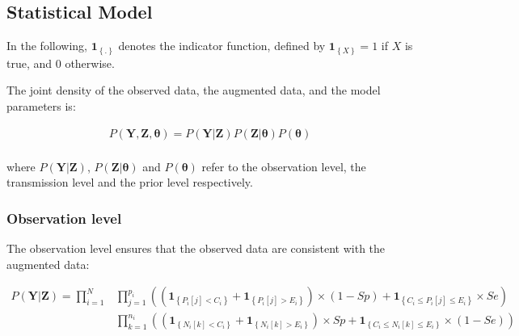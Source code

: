 \documentclass[10pt]{article}
\begin{document}
\subsection*{Statistical Model}

In the following, $\mathbf{1}_{\left\lbrace.\right\rbrace}$ denotes the indicator function, defined by $\mathbf{1}_{\left\lbrace X \right\rbrace}=1$ if $X$ is true, and $0$ otherwise.

The joint density of the observed data, the augmented data, and the model parameters is: 

\begin{equation} \label {JointDensity}
\begin{split}
P\left(\bm{Y},\bm{Z},\bm{\theta}\right) = P\left(\bm{Y}|\bm{Z}\right)P\left(\bm{Z}|\bm{\theta}\right)P\left(\bm{\theta}\right)\\ \nonumber
\end{split}
\end{equation}

\noindent where $P\left(\bm{Y}|\bm{Z}\right)$, $P\left(\bm{Z}|\bm{\theta}\right)$ 
and $P\left(\bm{\theta}\right)$ refer to the observation level, the transmission level
 and the prior level respectively.


\subsubsection*{Observation level}


The observation level ensures that the observed data are consistent with the augmented data:

\begin{eqnarray*}
P\left(\bm{Y}|\bm{Z}\right) =
\bm{\prod}_{i=1}^N %
& \bm{\prod}_{j=1}^{p_i} %
\left(
\left( \mathbf{1}_{\left\lbrace P_i[j] < C_i \right\rbrace}+\mathbf{1}_{\left\lbrace P_i[j] > E_i \right\rbrace} \right) \times \left(1-Sp\right) %
+ \mathbf{1}_{\left\lbrace C_i \leq P_i[j] \leq E_i \right\rbrace} \times Se %
\right) \\ 
& \bm{\prod}_{k=1}^{n_i} %
\left(
\left( \mathbf{1}_{\left\lbrace N_i[k] < C_i \right\rbrace}+\mathbf{1}_{\left\lbrace N_i[k] > E_i \right\rbrace} \right) \times Sp %
+ \mathbf{1}_{\left\lbrace C_i \leq N_i[k] \leq E_i \right\rbrace} \times \left(1-Se\right) %
\right) \\ 
\end{eqnarray*}
\end{document}
